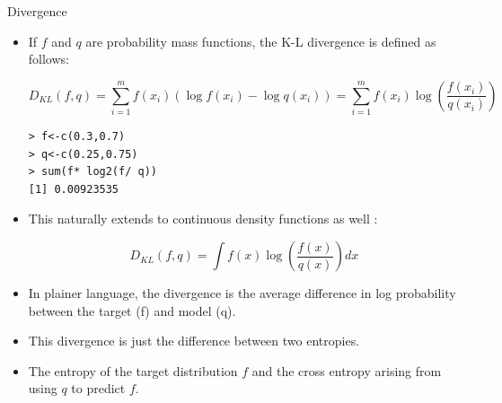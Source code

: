 \documentclass[handout]{beamer}
\begin{document}
\begin{frame}[fragile]{Divergence}
\scriptsize{

\begin{itemize}



\item If $f$ and $q$ are probability mass functions, the K-L divergence is defined as follows:

\begin{equation}
 D_{KL}(f,q) = \sum_{i=1}^m f(x_i)(\log f(x_i)-\log q(x_i)) = \sum_{i=1}^m f(x_i)\log \left(\frac{f(x_i)}{q(x_i)}\right)
\end{equation}

\begin{verbatim}
> f<-c(0.3,0.7)
> q<-c(0.25,0.75)
> sum(f* log2(f/ q)) 
[1] 0.00923535 
\end{verbatim}


\item This naturally extends to continuous density functions as well \cite{pml1Book}:

\begin{equation}
 D_{KL}(f,q) = \int f(x)\log \left(\frac{f(x)}{q(x)}\right)dx
\end{equation}


\item In plainer language, the divergence is the average difference in log probability between the target (f) and model (q). 

\item This divergence is just the difference between two entropies.

\item The entropy of the target distribution $f$ and the cross entropy arising from using $q$ to predict $f$.

\end{itemize}


} 
\end{frame}
\end{document}
